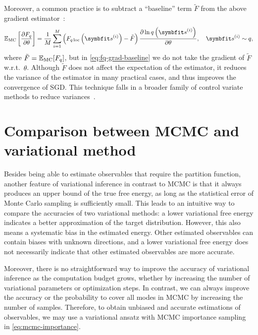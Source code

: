 Moreover, a common practice is to subtract a ``baseline'' term $\tilde{F}$ from the above gradient estimator~\cite{wu2019solving}:
\begin{equation}
\bbE_\text{MC}\left[ \frac{\partial F_q}{\partial \theta} \right]
= \frac{1}{M} \sum_{i = 1}^M \left( F_{q\,\text{loc}}\left( \vs^{(i)} \right) - \tilde{F} \right) \frac{\partial \ln q\left( \vs^{(i)} \right)}{\partial \theta}, \quad
\vs^{(i)} \sim q,
\label{eq:fq-grad-baseline}
\end{equation}
where $\tilde{F} = \mathbb{E}_\text{MC}[F_q]$, but in \cref{eq:fq-grad-baseline} we do not take the gradient of $\tilde{F}$ w.r.t.\ $\theta$. Although $\tilde{F}$ does not affect the expectation of the estimator, it reduces the variance of the estimator in many practical cases, and thus improves the convergence of SGD. This technique falls in a broader family of control variate methods to reduce variances~\cite{ranganath2014black}.

\section{Comparison between MCMC and variational method}
\label{sec:compare-mcmc}

Besides being able to estimate observables that require the partition function, another feature of variational inference in contrast to MCMC is that it always produces an upper bound of the true free energy, as long as the statistical error of Monte Carlo sampling is sufficiently small. This leads to an intuitive way to compare the accuracies of two variational methods: a lower variational free energy indicates a better approximation of the target distribution. However, this also means a systematic bias in the estimated energy. Other estimated observables can contain biases with unknown directions, and a lower variational free energy does not necessarily indicate that other estimated observables are more accurate.

Moreover, there is no straightforward way to improve the accuracy of variational inference as the computation budget grows, whether by increasing the number of variational parameters or optimization steps. In contrast, we can always improve the accuracy or the probability to cover all modes in MCMC by increasing the number of samples. Therefore, to obtain unbiased and accurate estimations of observables, we may use a variational ansatz with MCMC importance sampling in \cref{eq:mcmc-importance}.

